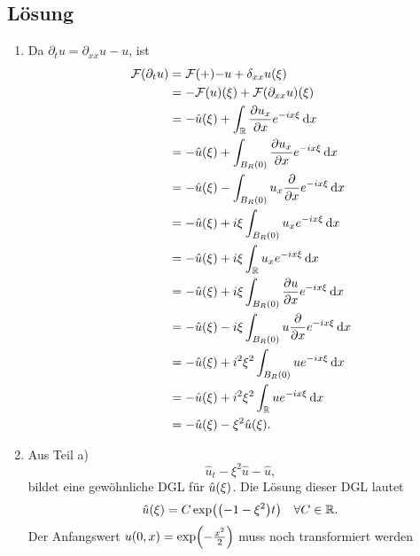 \documentclass{exercise}
\begin{document}
    \subsection*{Lösung}
    \begin{enumerate}
        \item Da \(\partial_t u = \partial_{xx}u - u\), ist
        \begin{align*}
            \mathcal{F}\parentheses*{\partial_t u} &= \mathcal{F}\parentheses+{-u + \delta_{xx}u}\parentheses*{\xi}\\
            &= -\mathcal{F}\parentheses*{u}\parentheses*{\xi} + \mathcal{F}\parentheses*{\partial_{xx}u}\parentheses*{\xi}\\
            &= -\hat{u}\parentheses*{\xi} + \int_\R \frac{\partial u_x}{\partial x}e^{-ix\xi}\d x\\
            &= -\hat{u}\parentheses*{\xi} + \int_{B_R\parentheses*{0}}\frac{\partial u_x}{\partial x}e^{-ix\xi}\d x\\
            &= -\hat{u}\parentheses*{\xi} - \int_{B_R\parentheses*{0}}u_x\frac{\partial}{\partial x}e^{-ix\xi}\d x\\
            &= -\hat{u}\parentheses*{\xi} + i\xi\int_{B_R\parentheses*{0}}u_x e^{-ix\xi}\d x\\
            &= -\hat{u}\parentheses*{\xi} + i\xi\int_\R u_x e^{-ix\xi}\d x\\
            &= -\hat{u}\parentheses*{\xi} + i\xi\int_{B_R\parentheses*{0}}\frac{\partial u}{\partial x}e^{-ix\xi}\d x\\
            &= -\hat{u}\parentheses*{\xi} - i\xi\int_{B_R\parentheses*{0}}u\frac{\partial}{\partial x}e^{-ix\xi}\d x\\
            &= -\hat{u}\parentheses*{\xi} + i^2 \xi^2 \int_{B_R\parentheses*{0}}ue^{-ix\xi}\d x\\
            &= -\hat{u}\parentheses*{\xi} + i^2 \xi^2 \int_\R ue^{-ix\xi}\d x\\
            &= -\hat{u}\parentheses*{\xi} - \xi^2 \hat{u}\parentheses*{\xi}.
        \end{align*}
        \item Aus Teil a)
        \[
            \hat{u}_t  -\xi^2 \hat{u} - \hat{u},
        \]
        bildet eine gewöhnliche DGL für \(\hat{u}\parentheses*{\xi}\).
        Die Lösung dieser DGL lautet
        \[
            \hat{u}\parentheses*{\xi} = C\exp\parentheses*{\parentheses*{-1 - \xi^2}t} \quad \forall C \in \R.
        \]
        Der Anfangswert \(u\parentheses*{0, x} = \exp\parentheses*{-\frac{x^2}{2}}\) muss noch transformiert werden

\end{enumerate}
\end{document}
